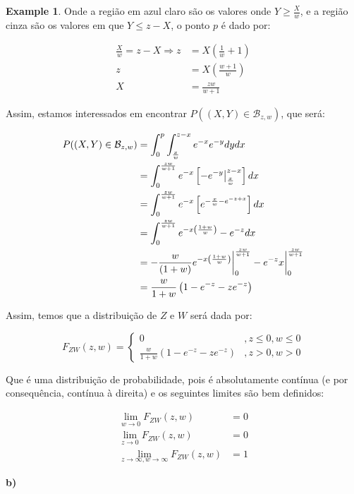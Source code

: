 \documentclass[
]{article}
\theoremstyle{definition}
\theoremstyle{definition}
\newtheorem{example}{Example}[section]
\theoremstyle{definition}
\theoremstyle{definition}
\theoremstyle{remark}
\begin{document}
\begin{example}
Onde a região em azul claro são os valores onde \(Y \ge \frac{X}{w}\), e a região cinza são os valores em que \(Y \le z - X\), o ponto \(p\) é dado por:

\begin{align*}
\frac{X}{w} = z - X \Rightarrow z &= X \left(\frac{1}{w} +1\right) \\
z &= X\left(\frac{w+1}{w}\right) \\
X &= \frac{zw}{w+1}
\end{align*}

Assim, estamos interessados em encontrar \(P((X,Y) \in \mathcal{B}_{z,w})\), que será:

\begin{align*}
P((X,Y) \in \mathcal{B}_{z,w}) &= \int_{0}^{p}\int_{\frac{x}{w}}^{z-x}e^{-x}e^{-y}dydx \\
&= \int_{0}^{\frac{zw}{w+1}}e^{-x}\left[-e^{-y}\big{|}_{\frac{x}{w}}^{z-x}\right]dx \\
&= \int_{0}^{\frac{zw}{w+1}}e^{-x}\left[e^{-\frac{x}{w}-e^{-z+x}}\right]dx \\
&= \int_{0}^{\frac{zw}{w+1}}e^{-x\left(\frac{1 + w}{w}\right)}-e^{-z}dx \\
&= -\frac{w}{(1+w)}e^{-x\left(\frac{1 + w}{w}\right)}\bigg{|}_{0}^{\frac{zw}{w+1}}-e^{-z}x\bigg{|}_{0}^{\frac{zw}{w+1}} \\
&= \frac{w}{1+w}\left(1-e^{-z}-ze^{-z}\right)
\end{align*}

Assim, temos que a distribuição de \(Z\) e \(W\) será dada por:

\begin{equation*}
F_{ZW}(z,w) = \begin{cases}
0 & ,z \le 0, w \le 0 \\
\frac{w}{1+w}\left(1-e^{-z}-ze^{-z}\right) & ,z > 0, w > 0
\end{cases}
\end{equation*}

Que é uma distribuição de probabilidade, pois é absolutamente contínua (e por consequência, contínua à direita) e os seguintes limites são bem definidos:

\begin{align*}
\lim_{w \to 0}F_{ZW}(z,w) &= 0 \\
\lim_{z \to 0}F_{ZW}(z,w) &= 0 \\
\lim_{z \to \infty, w \to \infty}F_{ZW}(z,w) &= 1
\end{align*}

\textbf{b)}


\end{example}
\end{document}

